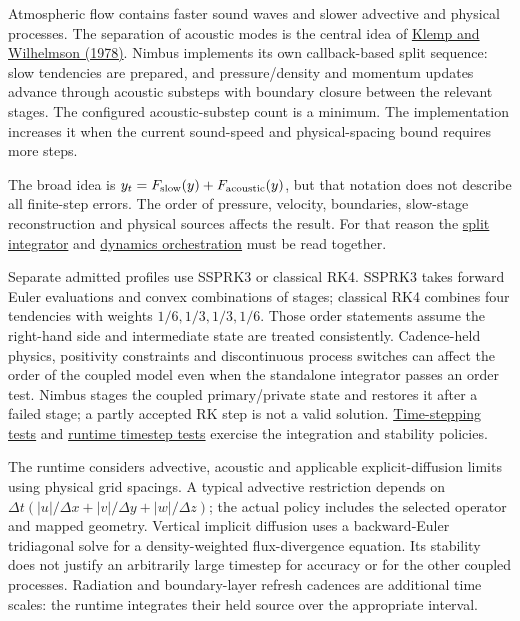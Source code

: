\documentclass[
  11pt,
]{report}
\begin{document}
Atmospheric flow contains faster sound waves and slower advective and
physical processes. The separation of acoustic modes is the central idea
of
\href{https://journals.ametsoc.org/abstract/journals/atsc/35/6/1520-0469_1978_035_1070_tsotdc_2_0_co_2.xml}{Klemp
and Wilhelmson (1978)}. Nimbus implements its own callback-based split
sequence: slow tendencies are prepared, and pressure/density and
momentum updates advance through acoustic substeps with boundary closure
between the relevant stages. The configured acoustic-substep count is a
minimum. The implementation increases it when the current sound-speed
and physical-spacing bound requires more steps.

The broad idea is \(y_t=F_{\rm slow}(y)+F_{\rm acoustic}(y)\), but that
notation does not describe all finite-step errors. The order of
pressure, velocity, boundaries, slow-stage reconstruction and physical
sources affects the result. For that reason the
\href{../src/numerics/time_stepping/schemes/split_explicit/split_explicit.cpp}{split
integrator} and
\href{../src/core/orchestration/dynamics/dynamics.cpp}{dynamics
orchestration} must be read together.

Separate admitted profiles use SSPRK3 or classical RK4. SSPRK3 takes
forward Euler evaluations and convex combinations of stages; classical
RK4 combines four tendencies with weights \(1/6,1/3,1/3,1/6\). Those
order statements assume the right-hand side and intermediate state are
treated consistently. Cadence-held physics, positivity constraints and
discontinuous process switches can affect the order of the coupled model
even when the standalone integrator passes an order test. Nimbus stages
the coupled primary/private state and restores it after a failed stage;
a partly accepted RK step is not a valid solution.
\href{../tests/numerics/test_time_stepping.cpp}{Time-stepping tests} and
\href{../tests/numerics/test_runtime_timestep.cpp}{runtime timestep
tests} exercise the integration and stability policies.

The runtime considers advective, acoustic and applicable
explicit-diffusion limits using physical grid spacings. A typical
advective restriction depends on
\(\Delta t(|u|/\Delta x+|v|/\Delta y+|w|/\Delta z)\); the actual policy
includes the selected operator and mapped geometry. Vertical implicit
diffusion uses a backward-Euler tridiagonal solve for a density-weighted
flux-divergence equation. Its stability does not justify an arbitrarily
large timestep for accuracy or for the other coupled processes.
Radiation and boundary-layer refresh cadences are additional time
scales: the runtime integrates their held source over the appropriate
interval.
\end{document}
